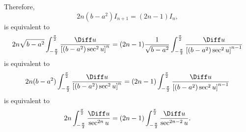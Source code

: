 \begin{enumerate}
          Therefore,
          \[
              2n(b - a^2) I_{n + 1} = (2n - 1) I_n,
          \]
          is equivalent to
          \[
              2n \sqrt{b - a^2} \int_{-\frac{\pi}{2}}^{\frac{\pi}{2}} \frac{\Diff u}{\left[(b - a^2) \sec^2 u\right]^{n}} = (2n-1) \frac{1}{\sqrt{b - a^2}} \int_{-\frac{\pi}{2}}^{\frac{\pi}{2}} \frac{\Diff u}{\left[(b - a^2) \sec^2 u\right]^{n - 1}}
          \]
          is equivalent to
          \[
              2n (b - a^2) \int_{-\frac{\pi}{2}}^{\frac{\pi}{2}} \frac{\Diff u}{\left[(b - a^2) \sec^2 u\right]^{n}} = (2n-1) \int_{-\frac{\pi}{2}}^{\frac{\pi}{2}} \frac{\Diff u}{\left[(b - a^2) \sec^2 u\right]^{n - 1}}
          \]
          is equivalent to
          \[
              2n \int_{- \frac{\pi}{2}}^{\frac{\pi}{2}} \frac{\Diff u}{\sec^{2n} u} = (2n - 1) \int_{- \frac{\pi}{2}}^{\frac{\pi}{2}} \frac{\Diff u}{\sec^{2n - 2} u}.
          \]


\end{enumerate}
